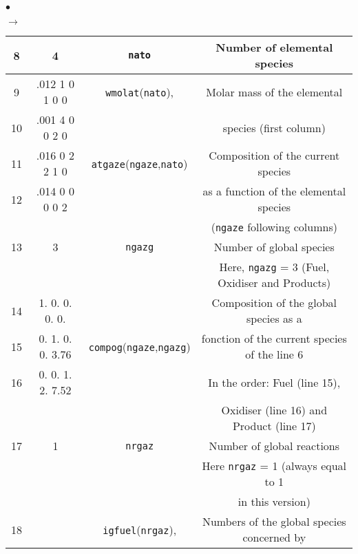 {{\begin{list}{$\bullet$}{}
\begin{list}{$\rightarrow$}{}
\begin{table}[htbp]
\begin{center}
{\begin{tabular}{|c|c|c|c|}
  8     &         4         &  \texttt{nato\index{nato}}   & Number of elemental species                      \\ \hline
  9     &.012  1  0  1  0  0& \texttt{wmolat\index{wmolat}}(\texttt{nato}),  & Molar mass of the elemental                      \\
 10     &.001  4  0  0  2  0&                              & species (first column)                           \\
 11     &.016  0  2  2  1  0&\texttt{atgaze\index{atgaze}}(\texttt{ngaze},\texttt{nato})& Composition of the current species             \\
 12     &.014  0  0  0  0  2&                              & as a function of the elemental species           \\
        &                   &                              & (\texttt{ngaze} following columns)                        \\ \hline
 13     &         3         &  \texttt{ngazg\index{ngazg}} & Number of global species                         \\
        &                   &                              & Here, \texttt{ngazg} = 3 (Fuel, Oxidiser and Products)    \\ \hline
 14     &  1. 0. 0. 0. 0.   &                              & Composition of the global species as a           \\
 15     &  0. 1. 0. 0. 3.76 &\texttt{compog\index{compog}}(\texttt{ngaze},\texttt{ngazg})& fonction of the current species of the line 6 \\
 16     &  0. 0. 1. 2. 7.52 &                              & In the order: Fuel (line 15),                    \\
        &                   &                              & Oxidiser (line 16) and Product (line 17)         \\ \hline
 17     &         1         &  \texttt{nrgaz\index{nrgaz}} & Number of global reactions                       \\
        &                   &                              & Here \texttt{nrgaz} = 1 (always equal to 1                \\
        &                   &                              & in this version)                                 \\ \hline
 18     &                   & \texttt{igfuel\index{igfuel}}(\texttt{nrgaz}), & Numbers of the global species concerned by       \\

\end{tabular}}
\end{center}
\end{table}
\end{list}
\end{list}}}
